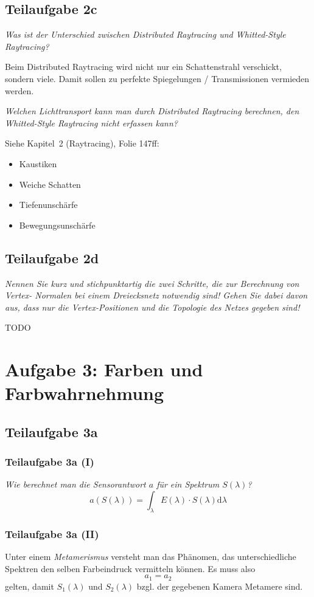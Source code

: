 \documentclass[a4paper]{scrartcl}
\begin{document}
\subsection*{Teilaufgabe 2c}

\textit{Was ist der Unterschied zwischen Distributed Raytracing und Whitted-Style Raytracing?}

Beim Distributed Raytracing wird nicht nur ein Schattenstrahl verschickt, sondern
viele. Damit sollen zu perfekte Spiegelungen / Transmissionen vermieden werden.

\textit{Welchen Lichttransport kann man durch Distributed Raytracing berechnen, den
Whitted-Style Raytracing nicht erfassen kann?}

Siehe Kapitel~2 (Raytracing), Folie 147ff:

\begin{itemize}
    \item Kaustiken
    \item Weiche Schatten
    \item Tiefenunschärfe
    \item Bewegungsunschärfe
\end{itemize}

\subsection*{Teilaufgabe 2d}
\textit{Nennen Sie kurz und stichpunktartig die zwei Schritte, die zur Berechnung von Vertex-
Normalen bei einem Dreiecksnetz notwendig sind! Gehen Sie dabei davon aus, dass nur
die Vertex-Positionen und die Topologie des Netzes gegeben sind!}

TODO

\clearpage
\section*{Aufgabe 3: Farben und Farbwahrnehmung}
\subsection*{Teilaufgabe 3a}
\subsubsection*{Teilaufgabe 3a (I)}
\textit{Wie berechnet man die Sensorantwort $a$ für ein Spektrum $S(\lambda)$?}
\[a(S(\lambda)) = \int_\lambda E(\lambda) \cdot S(\lambda) \mathrm{d} \lambda \]

\subsubsection*{Teilaufgabe 3a (II)}
Unter einem \textit{Metamerismus} versteht man das Phänomen, das
unterschiedliche Spektren den selben Farbeindruck vermitteln können. Es muss
also
\[a_1 = a_2\]
gelten, damit $S_1(\lambda)$ und $S_2(\lambda)$ bzgl. der gegebenen Kamera
Metamere sind.
\end{document}
